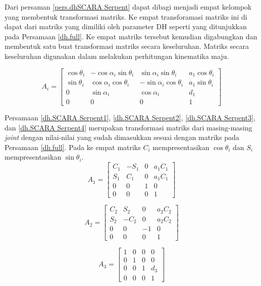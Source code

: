 Dari persaman \ref{pers.dhSCARA Serpent} dapat dibagi menjadi empat kelompok yang membentuk transformasi matriks. Ke empat transforamasi matriks ini di dapat dari matriks yang dimiliki oleh parameter DH seperti yang ditunjukkan pada Persamaan \ref{dh.full}. Ke empat matriks tersebut kemudian digabungkan dan membentuk satu buat transformasi matriks secara keseluruhan. Matriks secara keseluruhan digunakan dalam melakukan perhitungan kinematika maju.

\begin{equation}
A_{i} = \begin{bmatrix}
\cos\theta_{i} &  -\cos\alpha_{i}\sin\theta_{i}&  \sin\alpha_{i}\sin\theta_{i}& a_{1}\cos\theta_{i}\\ 
\sin\theta_{i}&  \cos\alpha_{i}\cos\theta_{i}&  -\sin\alpha_{i}\cos\theta_{i}& a_{1}\sin\theta_{i}\\ 
0&\sin\alpha_{i}  &\cos\alpha_{i}  &d_{1} \\ 
0 & 0 & 0 &1 
\end{bmatrix}
\label{dh.full}
\end{equation}

Persamaan \ref{dh.SCARA Serpent1}, \ref{dh.SCARA Serpent2}, \ref{dh.SCARA Serpent3}, dan \ref{dh.SCARA Serpent4} merupakan transformasi matriks dari masing-masing \textit{joint} dengan nilai-nilai yang sudah dimasukkan sesuai dengan matriks pada Persamaan \ref{dh.full}. Pada ke empat matriks $C_{i}$ mempresentasikan $\cos\theta_{i}$ dan $S_{i}$ mempresentasikan $\sin\theta_{i}$.
\begin{equation}
A_{1} = \begin{bmatrix}
C_{1} &  -S_{1}&  0& a_{1}C_{1}\\ 
S_{1}&  C_{1}&  0& a_{1}C_{1}\\ 
0&0  &1  &0 \\ 
0 & 0 & 0 &1 
\end{bmatrix}
\label{dh.SCARA Serpent1}
\end{equation}

\begin{equation}
A_{2} = \begin{bmatrix}
C_{2} &  S_{2}&  0& a_{2}C_{2}\\ 
S_{2}&  -C_{2}&  0& a_{2}C_{2}\\ 
0&0  &-1  &0 \\ 
0 & 0 & 0 &1 
\end{bmatrix}
\label{dh.SCARA Serpent2}
\end{equation}


\begin{equation}A_{3}=\begin{bmatrix}
1 & 0 &0  &0 \\ 
0&1  &0  &0 \\ 
0 &0  &1  &d_{3} \\ 
0&0  &0  &1 
\end{bmatrix} 
\label{dh.SCARA Serpent3}
\end{equation}


